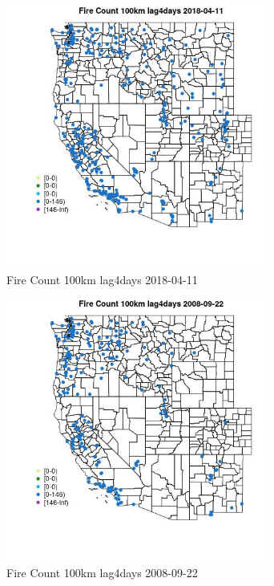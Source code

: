 \begin{figure} 
\centering  
\includegraphics[width=0.77\textwidth]{Code_Outputs/Report_ML_input_PM25_Step4_part_e_de_duplicated_aves_compiled_2019-05-18wNAs_MapObsFire_Count_100km_lag4days2018-04-11.jpg} 
\caption{\label{fig:Report_ML_input_PM25_Step4_part_e_de_duplicated_aves_compiled_2019-05-18wNAsMapObsFire_Count_100km_lag4days2018-04-11}Fire Count 100km lag4days 2018-04-11} 
\end{figure} 
 

\clearpage 

\begin{figure} 
\centering  
\includegraphics[width=0.77\textwidth]{Code_Outputs/Report_ML_input_PM25_Step4_part_e_de_duplicated_aves_compiled_2019-05-18wNAs_MapObsFire_Count_100km_lag4days2008-09-22.jpg} 
\caption{\label{fig:Report_ML_input_PM25_Step4_part_e_de_duplicated_aves_compiled_2019-05-18wNAsMapObsFire_Count_100km_lag4days2008-09-22}Fire Count 100km lag4days 2008-09-22} 
\end{figure} 
 

